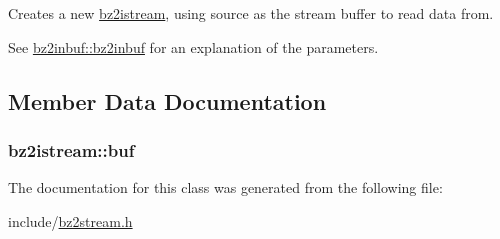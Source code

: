 Creates a new \hyperlink{classbz2istream}{bz2istream}, using source as the stream buffer to read data from. 

See \hyperlink{classbz2inbuf_a25f60f9742732d40bff5d5c01f93b8c3}{bz2inbuf\+::bz2inbuf} for an explanation of the parameters. 

\subsection{Member Data Documentation}
\hypertarget{classbz2istream_aeac9ec32bd8a9e9fc179f0d7db9be81a}{}
\subsubsection[{buf}]{ bz2istream\+::buf\hspace{0.3cm}{\ttfamily [protected]}}\label{classbz2istream_aeac9ec32bd8a9e9fc179f0d7db9be81a}


The documentation for this class was generated from the following file\+:\begin{DoxyCompactItemize}
\item 
include/\hyperlink{bz2stream_8h}{bz2stream.\+h}\end{DoxyCompactItemize}
